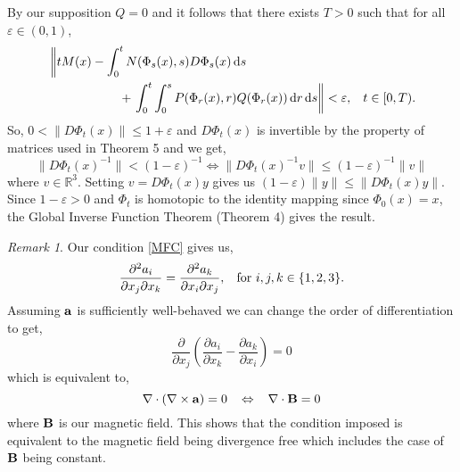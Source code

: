 \documentclass[a4paper,12pt,draft]{report}
\theoremstyle{remark}
\newtheorem{remark}{Remark}
\theoremstyle{definition}
\begin{document}
{By our supposition $Q = 0$ and it follows that there exists $T > 0$ such that for all $\varepsilon\in(0, 1)$,
\begin{align}
& \left\|tM(x) - \int_0^tN(\Phi_s(x), s)D\Phi_s(x)\,\mathrm{d}s\right.\nonumber\\
& \hspace{2cm} + \left.\int_0^t\int_0^sP(\Phi_r(x), r)Q(\Phi_r(x))\,\mathrm{d}r\,\mathrm{d}s\right\| < \varepsilon, \hspace{0.3cm} t \in [0, T).\nonumber
\end{align}
So, $0 < \|D\Phi_t(x)\| \le 1 + \varepsilon$ and $D\Phi_t(x)$ is invertible by the property of matrices used in Theorem 5 and we get,
$$
\|D\Phi_t(x)^{-1}\| < (1 - \varepsilon)^{-1} \Leftrightarrow \|D\Phi_t(x)^{-1}v\| \le (1 - \varepsilon)^{-1}\|v\|
$$
where $v \in \mathbb{R}^3$. Setting $v = D\Phi_t(x)y$ gives us $(1 - \varepsilon)\|y\| \le \|D\Phi_t(x)y\|$.  Since $1 - \varepsilon > 0$ and $\Phi_t$ is homotopic to the identity mapping since $\Phi_0(x) = x$, the Global Inverse Function Theorem (Theorem 4) gives the result.

\qedhere
}

\begin{remark}
{
Our condition \eqref{MFC} gives us,
$$
\frac{\partial^2 a_i}{\partial x_j \partial x_k} = \frac{\partial^2 a_k}{\partial x_i \partial x_j}, \hspace{0.3cm} \text{for } i, j, k \in \{1, 2, 3\}.
$$
Assuming $\bold{a}$ is sufficiently well-behaved we can change the order of differentiation to get,
$$
\frac{\partial}{\partial x_j}\left(\frac{\partial a_i}{\partial x_k} - \frac{\partial a_k}{\partial x_i}\right) = 0
$$
which is equivalent to,
$$
\nabla\cdot\left(\nabla\times\bold{a}\right) = 0 \hspace{0.3cm} \Leftrightarrow \hspace{0.3cm} \nabla\cdot\bold{B} = 0
$$
where $\bold{B}$ is our magnetic field.  This shows that the condition imposed is equivalent to the magnetic field being divergence free which includes the case of $\bold{B}$ being constant.
}
\end{remark}
\end{document}
